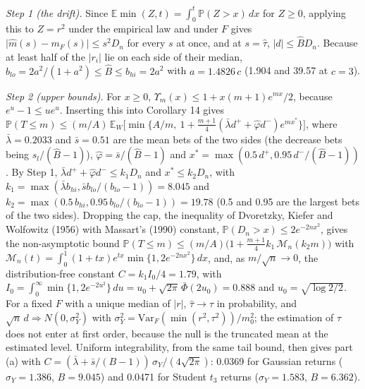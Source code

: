 \documentclass[
]{article}
\begin{document}
\emph{Step 1 (the drift).} Since
\(\mathbb{E}\min(Z, t) = \int_0^t \mathbb{P}(Z > x)\,dx\) for
\(Z \ge 0\), applying this to \(Z = r^2\) under the empirical law and
under \(F\) gives \(\lvert \hat m(s) - m_F(s)\rvert \le s^2 D_n\) for
every \(s\) at once, and at \(s = \hat\tau\),
\(\lvert d\rvert \le \hat B D_n\). Because at least half of the
\(\lvert r_i\rvert\) lie on each side of their median,
\(b_{lo} = 2a^2/(1 + a^2) \le \hat B \le b_{hi} = 2a^2\) with
\(a = 1.4826\,c\) (1.904 and 39.57 at \(c = 3\)).

\emph{Step 2 (upper bounds).} For \(x \ge 0\),
\(\Upsilon_m(x) \le 1 + x(m+1)e^{mx}/2\), because \(e^u - 1 \le ue^u\).
Inserting this into Corollary 14 gives
\(\mathbb{P}(T \le m) \le (m/A)\,\mathbb{E}_W\big[\min\lbrace A/m,\ 1 + \tfrac{m+1}{4}(\bar\lambda d^+ + \hat\varphi d^-)e^{m x^\ast}\rbrace\big]\),
where \(\bar\lambda = 0.2033\) and \(\bar s = 0.51\) are the mean bets
of the two sides (the decrease bets being \(s_l/(\hat B - 1)\)),
\(\hat\varphi = \bar s/(\hat B - 1)\) and
\(x^\ast = \max(0.5\,d^+, 0.95\,d^-/(\hat B - 1))\). By Step 1,
\(\bar\lambda d^+ + \hat\varphi d^- \le k_1 D_n\) and
\(x^\ast \le k_2 D_n\), with
\(k_1 = \max(\bar\lambda b_{hi}, \bar s b_{lo}/(b_{lo} - 1)) = 8.045\)
and \(k_2 = \max(0.5\,b_{hi}, 0.95\,b_{lo}/(b_{lo} - 1)) = 19.78\) (0.5
and 0.95 are the largest bets of the two sides). Dropping the cap, the
inequality of Dvoretzky, Kiefer and Wolfowitz (1956) with Massart's
(1990) constant, \(\mathbb{P}(D_n > x) \le 2e^{-2nx^2}\), gives the
non-asymptotic bound
\(\mathbb{P}(T \le m) \le (m/A)\big(1 + \tfrac{m+1}{4}k_1\,\mathcal{M}_n(k_2 m)\big)\)
with
\(\mathcal{M}_n(t) = \int_0^1 (1 + tx)e^{tx}\min\lbrace 1, 2e^{-2nx^2}\rbrace\,dx\),
and, as \(m/\sqrt n \to 0\), the distribution-free constant
\(C = k_1 I_0/4 = 1.79\), with
\(I_0 = \int_0^\infty \min\lbrace 1, 2e^{-2u^2}\rbrace\,du = u_0 + \sqrt{2\pi}\,\bar\Phi(2u_0) = 0.888\)
and \(u_0 = \sqrt{\log 2/2}\). For a fixed \(F\) with a unique median of
\(\lvert r\rvert\), \(\hat\tau \to \tau\) in probability, and
\(\sqrt n\, d \Rightarrow N(0, \sigma_Y^2)\) with
\(\sigma_Y^2 = \mathrm{Var}_F(\min(r^2, \tau^2))/m_0^2\); the estimation
of \(\tau\) does not enter at first order, because the null is the
truncated mean at the estimated level. Uniform integrability, from the
same tail bound, then gives part (a) with
\(C = (\bar\lambda + \bar s/(B-1))\,\sigma_Y/(4\sqrt{2\pi})\): 0.0369
for Gaussian returns (\(\sigma_Y = 1.386\), \(B = 9.045\)) and 0.0471
for Student \(t_3\) returns (\(\sigma_Y = 1.583\), \(B = 6.362\)).
\end{document}
